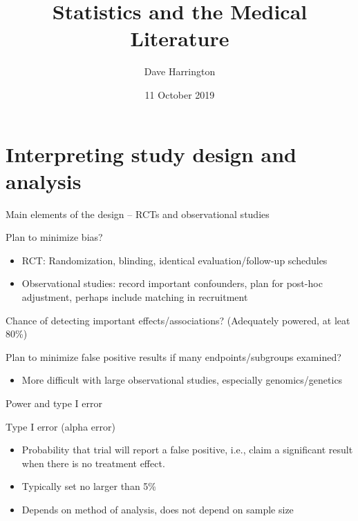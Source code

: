 \documentclass[ignorenonframetext,]{beamer}
\title{Statistics and the Medical Literature}
\author{Dave Harrington}
\date{11 October 2019}
\providecommand{\tightlist}{%
  \setlength{\itemsep}{0pt}\setlength{\parskip}{0pt}}
\begin{document}
\frame{\titlepage}

\begin{frame}
\tableofcontents[hideallsubsections]
\end{frame}
\hypertarget{interpreting-study-design-and-analysis}{%
\section{Interpreting study design and
analysis}\label{interpreting-study-design-and-analysis}}

\begin{frame}{Main elements of the design -- RCTs and observational
studies}
\protect\hypertarget{main-elements-of-the-design-rcts-and-observational-studies}{}

Plan to minimize bias?

\begin{itemize}
\item
  RCT: Randomization, blinding, identical evaluation/follow-up schedules
\item
  Observational studies: record important confounders, plan for post-hoc
  adjustment, perhaps include matching in recruitment
\end{itemize}

Chance of detecting important effects/associations? (Adequately powered,
at leat 80\%) \medskip

Plan to minimize false positive results if many endpoints/subgroups
examined?

\begin{itemize}
\tightlist
\item
  More difficult with large observational studies, especially
  genomics/genetics
\end{itemize}

\end{frame}

\begin{frame}{Power and type I error}
\protect\hypertarget{power-and-type-i-error}{}

Type I error (alpha error)

\begin{itemize}
\item
  Probability that trial will report a false positive, i.e., claim a
  significant result when there is no treatment effect.
\item
  Typically set no larger than 5\%
\item
  Depends on method of analysis, does not depend on sample size
\end{itemize}

\end{frame}
\end{document}
